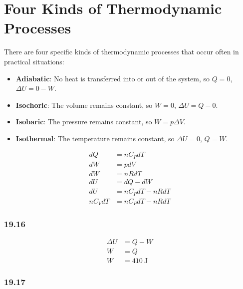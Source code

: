 \documentclass{article}
\begin{document}
\section{Four Kinds of Thermodynamic Processes}

There are four specific kinds of thermodynamic processes that occur often in practical situations:
\begin{itemize}
	\item
		\textbf{Adiabatic}: No heat is transferred into or out of the system, so $ Q = 0 $, $ \Delta U = 0 - W $.
	\item
		\textbf{Isochoric}: The volume remains constant, so $ W = 0 $, $ \Delta U = Q - 0 $.
	\item
		\textbf{Isobaric}: The pressure remains constant, so $ W = p\Delta V $.
	\item
		\textbf{Isothermal}: The temperature remains constant, so $ \Delta U = 0 $, $ Q = W $.
\end{itemize}
\begin{align*}
	dQ & = nC_PdT \\
	dW & = pdV \\
	dW & = nRdT \\
	dU & = dQ - dW \\
	dU & = nC_PdT - nRdT \\
	nC_VdT & = nC_PdT - nRdT
\end{align*}

\subsubsection{19.16}

\begin{align*}
	\Delta U & = Q - W \\
	W & = Q \\
	W & = \SI{410}{\joule}
\end{align*}

\subsubsection{19.17}
\end{document}
